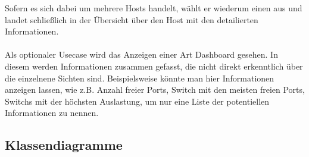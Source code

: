 Sofern es sich dabei um mehrere Hosts handelt, wählt er wiederum einen aus und landet schließlich in der Übersicht über den Host mit den detailierten Informationen.\\\\
Als optionaler Usecase wird das Anzeigen einer Art Dashboard gesehen.
In diesem werden Informationen zusammen gefasst, die nicht direkt erkenntlich über die einzelnene Sichten sind. Beispielsweise könnte man hier Informationen anzeigen lassen, wie z.B. Anzahl freier Ports, Switch mit den meisten freien Ports, Switchs mit der höchsten Auslastung, um nur eine Liste der potentiellen Informationen zu nennen.

\subsection{Klassendiagramme}
\label{subsec:classdiagrams}

